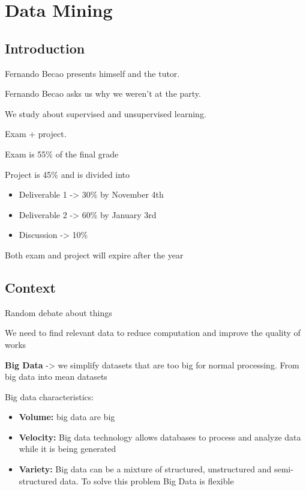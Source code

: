 \section{Data Mining}


\subsection{Introduction}

Fernando Becao presents himself and the tutor.

Fernando Becao asks us why we weren't at the party.

We study about supervised and unsupervised learning.

Exam + project.

Exam is 55\% of the final grade

Project is 45\% and is divided into

\begin{itemize}

\item Deliverable 1 -> 30\% by November 4th
\item Deliverable 2 -> 60\% by January 3rd
\item Discussion -> 10\%
\end{itemize}

Both exam and project will expire after the year


\subsection{Context}

Random debate about things

We need to find relevant data to reduce computation and improve the quality of works

\vspace{10pt}

\textbf{Big Data} -> we simplify datasets that are too big for normal processing. From big data into mean datasets

Big data characteristics:
\begin{itemize}
    \item \textbf{Volume:} big data are big
    \item \textbf{Velocity:} Big data technology allows databases to process and analyze data while it is being generated
    \item \textbf{Variety:} Big data can be a mixture of structured, unstructured and semi-structured data. To solve this problem Big Data is flexible
\end{itemize}

